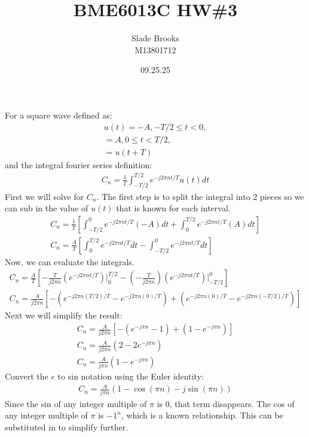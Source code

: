 \documentclass[12 pt]{article}
\title{BME6013C HW\#3}
\date{09.25.25}
\author{Slade Brooks \\ M13801712}
\begin{document}
\maketitle

For a square wave defined as:
\begin{align*}
    u(t) = -A, -T/2 \leq t < 0, \\
    = A, 0 \leq t < T/2, \\
    = u(t+T)
\end{align*}
and the integral fourier series definition:
\begin{align*}
    C_n=\frac{1}{T}\int_{-T/2}^{T/2}e^{-j2\pi nt/T}u(t)dt
\end{align*}
First we will solve for $C_n$. The first step is to split the integral into 2 pieces so we can sub in the value of
$u(t)$ that is known for each interval.
\begin{align*}
    C_n=\frac{1}{T}\left[\int_{-T/2}^{0}e^{-j2\pi nt/T}(-A)dt + \int_{0}^{T/2}e^{-j2\pi nt/T}(A)dt\right] \\
    C_n=\frac{A}{T}\left[\int_{0}^{T/2}e^{-j2\pi nt/T}dt - \int_{-T/2}^{0}e^{-j2\pi nt/T}dt\right]
\end{align*}
Now, we can evaluate the integrals.
\begin{align*}
    C_n=\frac{A}{T}\left[-\frac{T}{j2\pi n}\left(e^{-j2\pi nt/T}\right)\Big|_0^{T/2} - \left(-\frac{T}{j2\pi n}\right)
    \left(e^{-j2\pi nt/T}\right)\Big|_{-T/2}^0\right] \\
    C_n=\frac{A}{j2\pi n}\left[-\left(e^{-j2\pi n(T/2)/T} - e^{-j2\pi n(0)/T}\right)+
    \left(e^{-j2\pi n(0)/T}-e^{-j2\pi n(-T/2)/T}\right)\right]
\end{align*}
Next we will simplify the result:
\begin{align*}
    C_n=\frac{A}{j2\pi n}\left[-\left(e^{-j\pi n}-1\right)+\left(1-e^{-j\pi n}\right)\right] \\
    C_n=\frac{A}{j2\pi n}\left(2-2e^{-j\pi n}\right) \\
    C_n=\frac{A}{j\pi n}\left(1-e^{-j\pi n}\right)
\end{align*}
Convert the $e$ to sin notation using the Euler identity:
\begin{align*}
    C_n=\frac{A}{j\pi n}\left(1-\cos{(\pi n)}-j\sin{(\pi n)}\right)
\end{align*}
Since the sin of any integer multiple of $\pi$ is 0, that term disappears. The cos of any integer multiple of $\pi$ is
$-1^n$, which is a known relationship. This can be substituted in to simplify further.
\end{document}
